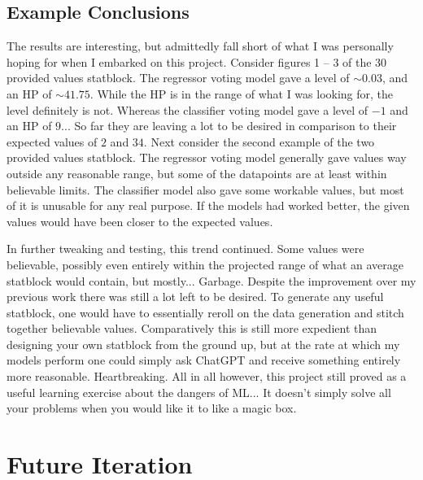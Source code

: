 \documentclass[11pt]{article}
\begin{document}
\subsection{Example Conclusions}

The results are interesting, but admittedly fall short of what I was personally hoping for when I embarked on this project. Consider figures 1 -- 3 of the 30 provided values statblock. The regressor voting model gave a level of $\sim0.03$, and an HP of $\sim41.75$. While the HP is in the range of what I was looking for, the level definitely is not. Whereas the classifier voting model gave a level of $-1$ and an HP of $9$... So far they are leaving a lot to be desired in comparison to their expected values of $2$ and $34$. Next consider the second example of the two provided values statblock. The regressor voting model generally gave values way outside any reasonable range, but some of the datapoints are at least within believable limits. The classifier model also gave some workable values, but most of it is unusable for any real purpose. If the models had worked better, the given values would have been closer to the expected values.

In further tweaking and testing, this trend continued. Some values were believable, possibly even entirely within the projected range of what an average statblock would contain, but mostly... Garbage. Despite the improvement over my previous work there was still a lot left to be desired. To generate any useful statblock, one would have to essentially reroll on the data generation and stitch together believable values. Comparatively this is still more expedient than designing your own statblock from the ground up, but at the rate at which my models perform one could simply ask ChatGPT and receive something entirely more reasonable. Heartbreaking. All in all however, this project still proved as a useful learning exercise about the dangers of ML... It doesn't simply solve all your problems when you would like it to like a magic box.

\section{Future Iteration}
\end{document}
